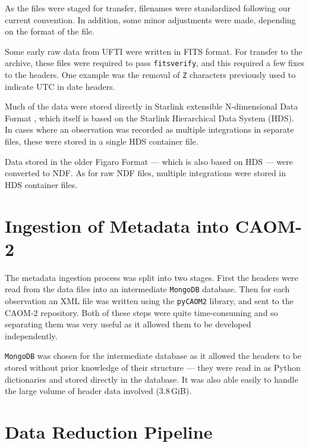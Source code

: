 \documentclass[11pt,twoside]{article}
\begin{document}
As the files were staged for transfer,
filenames were standardized following our current convention.
In addition,
some minor adjustments were made,
depending on the format of the file.


Some early raw data from UFTI were written in FITS format.
For transfer to the archive, these files were
required to pass
\texttt{fitsverify},
and this required a few fixes to the headers.
One example was the removal of \texttt{Z} characters
previously used to indicate UTC in date headers.


Much of the data were stored directly in
Starlink extensible N-dimensional Data Format
\citep[see for example,][]{P91_adassxxiii},
which itself is based on the
Starlink Hierarchical Data System (HDS).
In cases where an observation was recorded as
multiple integrations in separate files,
these were stored in a single HDS container file.


Data stored in the older Figaro Format \citep{1993ASPC...52..219S}
--- which is also based on HDS ---
were converted to NDF.
As for raw NDF files, multiple integrations
were stored in HDS container files.

\section{Ingestion of Metadata into CAOM-2}

The metadata ingestion process was split into two stages.
First the headers were
read from the data files into an intermediate
\texttt{MongoDB} database.
Then for each observation an XML file was written
using the \texttt{pyCAOM2} library,
and sent to the CAOM-2 repository.
Both of these steps were quite time-consuming
and so separating them was very useful
as it allowed them to be developed
independently.

\texttt{MongoDB} was chosen for the intermediate database
as it allowed the
headers to be stored without prior knowledge of their structure
--- they were read in as Python dictionaries and
stored directly in the database.
It was also able easily to handle the large
volume of header data involved (3.8\,GiB).

\section{Data Reduction Pipeline}
\end{document}
